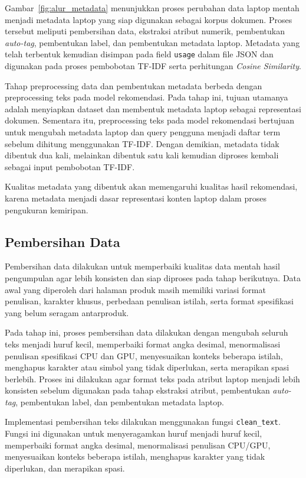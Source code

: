 Gambar~\ref{fig:alur_metadata} menunjukkan proses perubahan data laptop mentah menjadi metadata laptop yang siap digunakan sebagai korpus dokumen. Proses tersebut meliputi pembersihan data, ekstraksi atribut numerik, pembentukan \textit{auto-tag}, pembentukan label, dan pembentukan metadata laptop. Metadata yang telah terbentuk kemudian disimpan pada field \texttt{usage} dalam file JSON dan digunakan pada proses pembobotan TF-IDF serta perhitungan \textit{Cosine Similarity}.

Tahap preprocessing data dan pembentukan metadata berbeda dengan preprocessing teks pada model rekomendasi. Pada tahap ini, tujuan utamanya adalah menyiapkan dataset dan membentuk metadata laptop sebagai representasi dokumen. Sementara itu, preprocessing teks pada model rekomendasi bertujuan untuk mengubah metadata laptop dan query pengguna menjadi daftar term sebelum dihitung menggunakan TF-IDF. Dengan demikian, metadata tidak dibentuk dua kali, melainkan dibentuk satu kali kemudian diproses kembali sebagai input pembobotan TF-IDF.

Kualitas metadata yang dibentuk akan memengaruhi kualitas hasil rekomendasi, karena metadata menjadi dasar representasi konten laptop dalam proses pengukuran kemiripan.

\subsection{Pembersihan Data}
Pembersihan data dilakukan untuk memperbaiki kualitas data mentah hasil pengumpulan agar lebih konsisten dan siap diproses pada tahap berikutnya. Data awal yang diperoleh dari halaman produk masih memiliki variasi format penulisan, karakter khusus, perbedaan penulisan istilah, serta format spesifikasi yang belum seragam antarproduk.

Pada tahap ini, proses pembersihan data dilakukan dengan mengubah seluruh teks menjadi huruf kecil, memperbaiki format angka desimal, menormalisasi penulisan spesifikasi CPU dan GPU, menyesuaikan konteks beberapa istilah, menghapus karakter atau simbol yang tidak diperlukan, serta merapikan spasi berlebih. Proses ini dilakukan agar format teks pada atribut laptop menjadi lebih konsisten sebelum digunakan pada tahap ekstraksi atribut, pembentukan \textit{auto-tag}, pembentukan label, dan pembentukan metadata laptop.

Implementasi pembersihan teks dilakukan menggunakan fungsi \texttt{clean\_text}. Fungsi ini digunakan untuk menyeragamkan huruf menjadi huruf kecil, memperbaiki format angka desimal, menormalisasi penulisan CPU/GPU, menyesuaikan konteks beberapa istilah, menghapus karakter yang tidak diperlukan, dan merapikan spasi.

